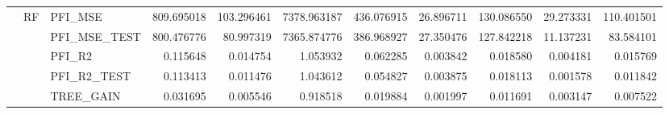 \begin{table}
\begin{tabular}{lllrrrrrrrr}
\cline{2-11}
 & \multirow[c]{9}{*}{RF} & PFI\_MSE & {\cellcolor[HTML]{5B7AE5}} \color[HTML]{F1F1F1} 809.695018 & {\cellcolor[HTML]{3D50C3}} \color[HTML]{F1F1F1} 103.296461 & {\cellcolor[HTML]{B40426}} \color[HTML]{F1F1F1} 7378.963187 & {\cellcolor[HTML]{4B64D5}} \color[HTML]{F1F1F1} 436.076915 & {\cellcolor[HTML]{3B4CC0}} \color[HTML]{F1F1F1} 26.896711 & {\cellcolor[HTML]{3E51C5}} \color[HTML]{F1F1F1} 130.086550 & {\cellcolor[HTML]{3B4CC0}} \color[HTML]{F1F1F1} 29.273331 & {\cellcolor[HTML]{3D50C3}} \color[HTML]{F1F1F1} 110.401501 \\
 &  & PFI\_MSE\_TEST & {\cellcolor[HTML]{5B7AE5}} \color[HTML]{F1F1F1} 800.476776 & {\cellcolor[HTML]{3D50C3}} \color[HTML]{F1F1F1} 80.997319 & {\cellcolor[HTML]{B40426}} \color[HTML]{F1F1F1} 7365.874776 & {\cellcolor[HTML]{4A63D3}} \color[HTML]{F1F1F1} 386.968927 & {\cellcolor[HTML]{3B4CC0}} \color[HTML]{F1F1F1} 27.350476 & {\cellcolor[HTML]{3F53C6}} \color[HTML]{F1F1F1} 127.842218 & {\cellcolor[HTML]{3B4CC0}} \color[HTML]{F1F1F1} 11.137231 & {\cellcolor[HTML]{3D50C3}} \color[HTML]{F1F1F1} 83.584101 \\
 &  & PFI\_R2 & {\cellcolor[HTML]{5B7AE5}} \color[HTML]{F1F1F1} 0.115648 & {\cellcolor[HTML]{3D50C3}} \color[HTML]{F1F1F1} 0.014754 & {\cellcolor[HTML]{B40426}} \color[HTML]{F1F1F1} 1.053932 & {\cellcolor[HTML]{4B64D5}} \color[HTML]{F1F1F1} 0.062285 & {\cellcolor[HTML]{3B4CC0}} \color[HTML]{F1F1F1} 0.003842 & {\cellcolor[HTML]{3E51C5}} \color[HTML]{F1F1F1} 0.018580 & {\cellcolor[HTML]{3B4CC0}} \color[HTML]{F1F1F1} 0.004181 & {\cellcolor[HTML]{3D50C3}} \color[HTML]{F1F1F1} 0.015769 \\
 &  & PFI\_R2\_TEST & {\cellcolor[HTML]{5B7AE5}} \color[HTML]{F1F1F1} 0.113413 & {\cellcolor[HTML]{3D50C3}} \color[HTML]{F1F1F1} 0.011476 & {\cellcolor[HTML]{B40426}} \color[HTML]{F1F1F1} 1.043612 & {\cellcolor[HTML]{4A63D3}} \color[HTML]{F1F1F1} 0.054827 & {\cellcolor[HTML]{3B4CC0}} \color[HTML]{F1F1F1} 0.003875 & {\cellcolor[HTML]{3F53C6}} \color[HTML]{F1F1F1} 0.018113 & {\cellcolor[HTML]{3B4CC0}} \color[HTML]{F1F1F1} 0.001578 & {\cellcolor[HTML]{3D50C3}} \color[HTML]{F1F1F1} 0.011842 \\
 &  & TREE\_GAIN & {\cellcolor[HTML]{445ACC}} \color[HTML]{F1F1F1} 0.031695 & {\cellcolor[HTML]{3B4CC0}} \color[HTML]{F1F1F1} 0.005546 & {\cellcolor[HTML]{B40426}} \color[HTML]{F1F1F1} 0.918518 & {\cellcolor[HTML]{3F53C6}} \color[HTML]{F1F1F1} 0.019884 & {\cellcolor[HTML]{3B4CC0}} \color[HTML]{F1F1F1} 0.001997 & {\cellcolor[HTML]{3D50C3}} \color[HTML]{F1F1F1} 0.011691 & {\cellcolor[HTML]{3B4CC0}} \color[HTML]{F1F1F1} 0.003147 & {\cellcolor[HTML]{3C4EC2}} \color[HTML]{F1F1F1} 0.007522 \\

\end{tabular}
\end{table}
